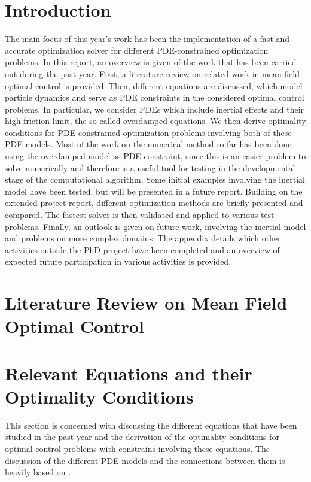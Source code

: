 \documentclass[11pt, a4paper]{article}
\theoremstyle{definition}
\begin{document}
\section{Introduction}
The main focus of this year's work has been the implementation of a fast and accurate optimization solver for different PDE-constrained optimization problems. In this report, an overview is given of the work that has been carried out during the past year. First, a literature review on related work in mean field optimal control is provided. Then, different equations are discussed, which model particle dynamics and serve as PDE constraints in the considered optimal control problems. In particular, we consider PDEs which include inertial effects and their high friction limit, the so-called overdamped equations. We then derive optimality conditions for PDE-constrained optimization problems involving both of these PDE models. Most of the work on the numerical method so far has been done using the overdamped model as PDE constraint, since this is an easier problem to solve numerically and therefore is a useful tool for testing in the developmental stage of the computational algorithm. Some initial examples involving the inertial model have been tested, but will be presented in a future report. 
Building on the extended project report, different optimization methods are briefly presented and compared. The fastest solver is then validated and applied to various test problems.
Finally, an outlook is given on future work, involving the inertial model and problems on more complex domains. The appendix details which other activities outside the PhD project have been completed and an overview of expected future participation in various activities is provided.


\section{Literature Review on Mean Field Optimal Control}

\section{Relevant Equations and their Optimality Conditions}
This section is concerned with discussing the different equations that have been studied in the past year and the derivation of the optimality conditions for optimal control problems with constrains involving these equations. The discussion of the different PDE models and the connections between them is heavily based on \cite{Archer1}.
\end{document}
